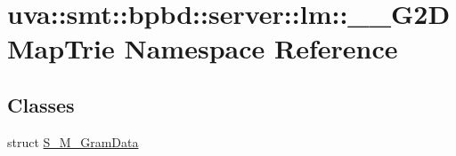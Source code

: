 \hypertarget{namespaceuva_1_1smt_1_1bpbd_1_1server_1_1lm_1_1_____g2_d_map_trie}{}\section{uva\+:\+:smt\+:\+:bpbd\+:\+:server\+:\+:lm\+:\+:\+\_\+\+\_\+\+G2\+D\+Map\+Trie Namespace Reference}
\label{namespaceuva_1_1smt_1_1bpbd_1_1server_1_1lm_1_1_____g2_d_map_trie}
\subsection*{Classes}
\begin{DoxyCompactItemize}
\item 
struct \hyperlink{structuva_1_1smt_1_1bpbd_1_1server_1_1lm_1_1_____g2_d_map_trie_1_1_s___m___gram_data}{S\+\_\+\+M\+\_\+\+Gram\+Data}
\end{DoxyCompactItemize}
